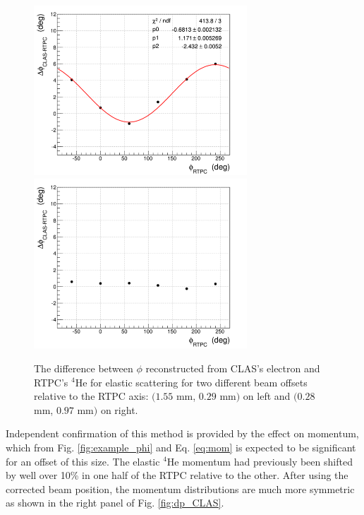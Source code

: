 \documentclass[amsmath,amssymb,notitlepage,12pt]{revtex4-1}
\begin{document}
\begin{figure}[htbp]\centering
    \includegraphics[width=8cm]{pics/CLASRTPC_dphi_phi_epass1v9.png}
    \includegraphics[width=8cm]{pics/Elasticdphi_vsphi_v11.png}
    \caption{The difference between $\phi$ reconstructed from CLAS's electron and RTPC's $^4$He for elastic scattering for two different beam offsets relative to the RTPC axis: $(1.55$ mm, $0.29$ mm$)$ on left and $(0.28$ mm, $0.97$ mm$)$ on right.
    \label{fig:dphi_CLAS}}
\end{figure}


Independent confirmation of this method is provided by the effect on momentum, which from Fig. \ref{fig:example_phi} and Eq. \ref{eq:mom} is expected to be significant for an offset of this size.  The elastic $^4$He momentum had previously been shifted by well over 10\% in one half of the RTPC relative to the other.  After using the corrected beam position, the momentum distributions are much more symmetric as shown in the right panel of Fig. \ref{fig:dp_CLAS}.
\end{document}
